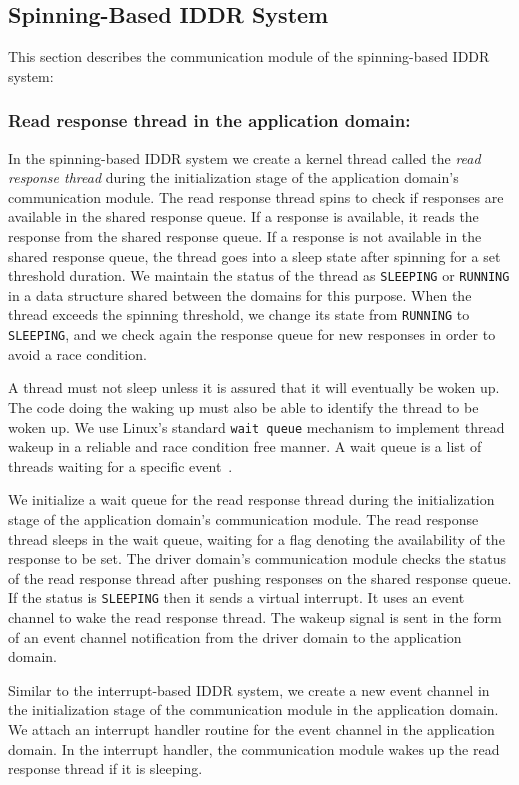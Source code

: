 \subsection{Spinning-Based IDDR System}
This section describes the communication module of the spinning-based IDDR system:

\subsubsection*{Read response thread in the application domain:} 
In the spinning-based IDDR system we create a kernel thread called the \textit{read
response thread} during the initialization stage of the application domain's 
communication module. The read response thread spins
to check if responses are available in the shared response queue. If a
response is available, it reads the response from the shared response
queue.  If a response is not available in the shared response
queue, the thread goes into a sleep state after spinning for a set threshold duration. 
We maintain the status of the thread as \texttt{SLEEPING} or \texttt{RUNNING}
in a data structure shared between the domains for this purpose. 
When the thread exceeds the spinning threshold, we change
its state from \texttt{RUNNING} to \texttt{SLEEPING}, and we check again the
response queue for new responses in order to avoid a race condition.

A thread must not sleep unless it is assured that it will eventually be woken up.
The code doing the waking up must also be able to 
identify the thread to be woken up.  We use Linux's standard \texttt{wait queue} mechanism
to implement thread wakeup in a reliable and race condition free manner.
A wait queue is a list of threads waiting for a specific event~\cite{Galvin, Bovet:2005:ULK:1077084}. 

We initialize a wait queue for the read response thread during the initialization stage 
of the application domain's communication module. The read response thread sleeps 
in the wait queue, waiting for a flag denoting the availability of the response to be set. 
The driver domain's communication module checks the status of the read response 
thread after pushing responses on the shared response queue. If the status is 
\texttt{SLEEPING} then it sends a virtual interrupt. It uses an event channel to wake the read
response thread. The wakeup signal is sent in the form of an event channel notification 
from the driver domain to the application domain. 

Similar to the interrupt-based IDDR system, we create a new event channel in
the initialization stage of the communication module in the application
domain. We attach an interrupt handler routine for the event channel
in the application domain. In the interrupt handler, the communication
module wakes up the read response thread if it is sleeping.

